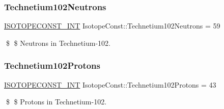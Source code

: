 \subsubsection{\texorpdfstring{Technetium102\+Neutrons}{Technetium102Neutrons}}
{\footnotesize\ttfamily \mbox{\hyperlink{group___isotope_const-_macros_ga5f18360b3e99483a35c32d789e62621c}{I\+S\+O\+T\+O\+P\+E\+C\+O\+N\+S\+T\+\_\+\+I\+NT}} Isotope\+Const\+::\+Technetium102\+Neutrons = 59}

\$ \$ Neutrons in Technetium-\/102. \mbox{\label{group___isotope_const-_technetium-_tc102_ga1645b2a00ae710398822e581a4e57d05}} 
\subsubsection{\texorpdfstring{Technetium102\+Protons}{Technetium102Protons}}
{\footnotesize\ttfamily \mbox{\hyperlink{group___isotope_const-_macros_ga5f18360b3e99483a35c32d789e62621c}{I\+S\+O\+T\+O\+P\+E\+C\+O\+N\+S\+T\+\_\+\+I\+NT}} Isotope\+Const\+::\+Technetium102\+Protons = 43}

\$ \$ Protons in Technetium-\/102. 